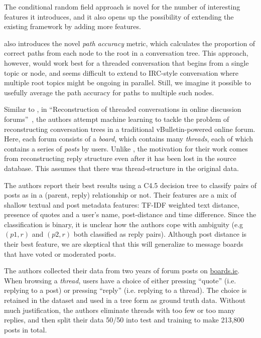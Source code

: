 \documentclass[11pt]{article}
\newcommand{\titlecite}[2]{``#1''~\cite{#2}}
\begin{document}
The conditional random field approach is novel for the number
of interesting features it introduces, and it also opens up the possibility of
extending the existing framework by adding more features.

\cite{Wang2011a} also introduces the novel \emph{path accuracy} metric, which
calculates the proportion of correct paths from each node to the root in a
conversation tree. This approach, however, would work best for a threaded
conversation that begins from a single topic or node, and seems difficult to extend
to IRC-style conversation where multiple root topics might
be ongoing in parallel. Still, we imagine it possible to usefully average the path
accuracy for paths to multiple such nodes.

Similar to \cite{Wang2011a}, in \titlecite{Reconstruction of threaded
conversations in online discussion forums}{Aumayr2011a}, the authors attempt machine learning to 
tackle the problem of reconstructing conversation trees in a traditional
vBulletin-powered online forum. Here, each forum consists of a \textit{board}, which
contains many \textit{threads}, each of which contains a series of
\textit{posts} by users. Unlike \cite{Wang2008a}, the motivation for their work
comes from reconstructing reply structure even after it has been lost in the
source database. This assumes that there was thread-structure in the original
data.

The authors report their best results using a C4.5 decision tree to classify
pairs of posts as in a (parent, reply) relationship or not. Their features are 
a mix of shallow textual and post metadata features: TF-IDF weighted text distance, 
presence of quotes and a user's name, post-distance and time difference. 
Since the classification is binary, it 
is unclear how the authors cope with ambiguity (e.g $(p1, r)$ and $(p2,r)$ both 
classified as reply pairs). Although post distance is their best feature, we are skeptical
that this will generalize to message boards that have voted or moderated posts.

The authors collected their data from two years of forum posts on
\url{boards.ie}. When browsing a \textit{thread}, users have a choice of either
pressing ``quote'' (i.e. replying to a post) or pressing ``reply'' (i.e.
replying to a thread). The choice is retained in the dataset and used in a
tree form as ground truth data. Without much justification, the authors eliminate
threads with too few or too many replies, and then split their data 50/50 into 
test and training to make 213,800 posts in total.
\end{document}
